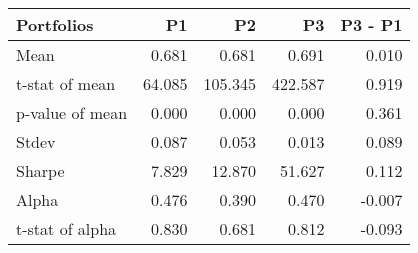 \begin{tabular}{lrrrr}
\toprule
Portfolios & P1 & P2 & P3 & P3 - P1 \\
\midrule
Mean & 0.681 & 0.681 & 0.691 & 0.010 \\
t-stat of mean & 64.085 & 105.345 & 422.587 & 0.919 \\
p-value of mean & 0.000 & 0.000 & 0.000 & 0.361 \\
Stdev & 0.087 & 0.053 & 0.013 & 0.089 \\
Sharpe & 7.829 & 12.870 & 51.627 & 0.112 \\
Alpha & 0.476 & 0.390 & 0.470 & -0.007 \\
t-stat of alpha & 0.830 & 0.681 & 0.812 & -0.093 \\
\bottomrule
\end{tabular}
